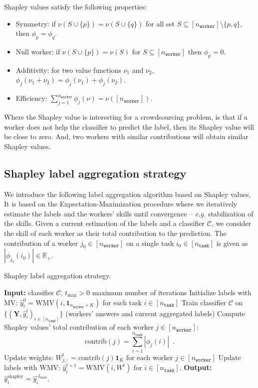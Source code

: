 \documentclass{cap2024}
\begin{document}
Shapley values satisfy the following properties:
\begin{itemize}
  \item Symmetry: if $\nu(S\cup\{p\})=\nu(S\cup\{q\})$ for all set $S\subseteq [n_\texttt{worker}]\setminus\{p,q\}$, then $\phi_p=\phi_q$.
  \item Null worker: if $\nu(S\cup\{p\})=\nu(S)$ for $S\subseteq [n_\texttt{worker}]$ then $\phi_p=0$.
  \item Additivity: for two value functions $\nu_1$ and $\nu_2$, $\phi_j(\nu_1+\nu_2)=\phi_j(\nu_1)+\phi_j(\nu_2)$.
  \item Efficiency: $\sum_{j=1}^{n_\texttt{worker}} \phi_j(\nu)=\nu([n_\texttt{worker}])$.
\end{itemize}


Where the Shapley value is interesting for a crowdsourcing problem, is that if a worker does not help the classifier to predict the label, then its Shapley value will be close to zero. And, two workers with similar contributions will obtain similar Shapley values.

\subsection{Shapley label aggregation strategy}

We introduce the following label aggregation algorithm based on Shapley values.
It is based on the Expectation-Maximization procedure where we iteratively estimate the labels and the workers' skills until convergence -- \emph{e.g.} stabilization of the skills.
Given a current estimation of the labels and a classifier $\mathcal{C}$, we consider the skill of each worker as their total contribution to the prediction.
The contribution of a worker $j_0\in[n_\texttt{worker}]$ on a single task $i_0\in [n_\texttt{task}]$ is given as $|\phi_{j_0}(i_0)|\in\mathbb{R}_+$.

\begin{algorithm}[tbh]
  \caption{Shapley label aggregation strategy.}\label{alg:shap}
  \begin{algorithmic}[1]
    \State \textbf{Input:} classifier $\mathcal{C}$, $t_{\max}>0$ maximum number of iterations
  \State Initialize labels with MV: $\hat{y}_i^0 = \mathrm{WMV}(i, \mathbf{1}_{n_\texttt{worker}\times K})$ for each task $i\in [n_\texttt{task}]$
        \State Train classifier $\mathcal{C}$ on $\{(\mathbf{Y}, \hat{y}_i^t)_{i\in [n_\texttt{task}]}\}$ (workers' answers and current aggregated labels)
        \State Compute Shapley values' total contribution of each worker $j\in [n_\texttt{worker}]$:
        \[ \mathrm{contrib}(j) = \sum_{i=1}^{n_\texttt{task}} |\phi_{j}(i)|\enspace. \]
        \State Update weights: $W^t_{j,:} = \mathrm{contrib}(j)\mathbf{1}_K$ for each worker $j\in [n_\texttt{worker}]$
        \State Update labels with WMV: $\hat{y}_i^{t+1} = \mathrm{WMV}(i, W^{t})$ for $i\in[n_\texttt{task}]$.
    \EndFor
    \State \textbf{Output:} $\hat{y}_i^\text{shapley} = \hat{y_i}^{t_{\max}}$.
  \end{algorithmic}
  \end{algorithm}
\end{document}
